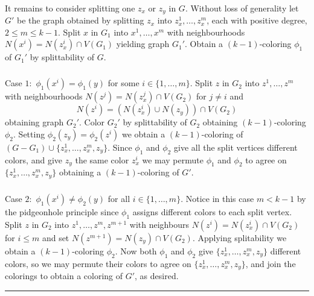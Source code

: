 \documentclass[letterpaper,12pt,oneside,onecolumn]{article}
\newenvironment{proof}{{\bf Proof:  }}{\hfill\rule{2mm}{2mm}}
\begin{document}
\begin{proof}
	\paragraph{}
	It remains to consider splitting one $z_x$ or $z_y$ in $G$. Without loss of generality let $G'$ be the graph obtained by splitting $z_x$ into $z_x^1, \dots, z_x^m$, each with positive degree, $2 \leq m \leq k-1$. Split $x$ in $G_1$ into $x^1, \dots, x^m$ with neighbourhoods $N(x^i) = N(z_x^i)\cap V(G_1)$ yielding graph $G_1'$. Obtain a $(k-1)$-coloring $\phi_1$ of $G_1'$ by splittability of $G$.
	\subparagraph{}Case $1:$ $\phi_1(x^i) = \phi_1(y)$ for some $i \in \{1,\dots, m\}$. Split $z$ in $G_2$ into $z^1,\dots, z^m$ with neighbourhoods $N(z^j) = N(z_x^j) \cap V(G_2)$ for $j \neq i$ and $$N(z^i) = (N(z_x^i) \cup N(z_y)) \cap V(G_2)$$
	obtaining graph $G_2'$. Color $G_2'$ by splittability of $G_2$ obtaining $(k-1)$-coloring $\phi_2$. Setting $\phi_2(z_y) = \phi_2(z^i)$ we obtain a $(k-1)$-coloring of $(G-G_1) \cup \{z_x^1, \dots, z_x^m, z_y\}$. Since $\phi_1$ and $\phi_2$ give all the split vertices different colors, and give $z_y$ the same color $z_x^i$ we may permute $\phi_1$ and $\phi_2$ to agree on $\{z_x^1, \dots, z_x^m, z_y\}$ obtaining a $(k-1)$-coloring of $G'$.
	\subparagraph{}Case $2:$ $\phi_1(x^i) \neq \phi_2(y)$ for all $i \in \{1,\dots, m\}$. Notice in this case $m < k-1$ by the pidgeonhole principle since $\phi_1$ assigns different colors to each split vertex. Split $z$ in $G_2$ into $z^1, \dots, z^m, z^{m+1}$ with neighbours $N(z^i) = N(z_x^i) \cap V(G_2)$ for $i \leq m$ and set $N(z^{m+1}) = N(z_y) \cap V(G_2)$. Applying splitability we obtain a $(k-1)$-coloring $\phi_2$. Now both $\phi_1$ and $\phi_2$ give $\{z_x^1, \dots, z_x^m, z_y\}$ different colors, so we may permute their colors to agree on $\{z_x^1, \dots, z_x^m, z_y\}$, and join the colorings to obtain a coloring of $G'$, as desired.
	\end{proof}
\end{document}
